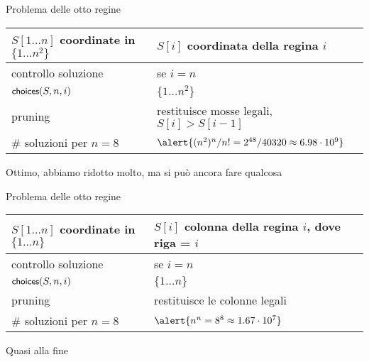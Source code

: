 \begin{frame}{Problema delle otto regine}


\medskip
\begin{tabular}{|P{4cm}|P{7.1cm}|}
\hline
$S[1 \ldots n]$ coordinate in $\{ 1 \ldots n^2 \}$	&	$S[i]$ coordinata della regina $i$ \\\hline
controllo soluzione	& se $i = n$ \\\hline
$\textsf{{\small choices}}(S, n, i)$	&	$\{ 1 \ldots n^2 \}$ \\\hline
pruning	&	restituisce mosse legali, \alert{\small $S[i] > S[i-1]$} \\\hline
\# soluzioni per $n=8$ 	&		$\alert{(n^2)^n/n! = 2^{48}/40320 \approx 6.98 \cdot 10^{9}}$\\\hline 
\end{tabular}

\smallskip
{}
\BI
\item Ottimo, abbiamo ridotto molto, ma si può ancora fare qualcosa
\EI

\end{frame}


\begin{frame}{Problema delle otto regine}


\medskip
\begin{tabular}{|P{4cm}|P{7.1cm}|}
\hline
$S[1 \ldots n]$ coordinate in $\{ 1 \ldots n \}$	&	$S[i]$ colonna della regina $i$, dove riga = $i$ \\\hline
controllo soluzione	& se $i = n$ \\\hline
$\textsf{{\small choices}}(S, n, i)$	&	$\{ 1 \ldots n \}$ \\\hline
pruning	&	restituisce le colonne legali \\\hline
\# soluzioni per $n=8$ 	&		$\alert{n^n = 8^{8} \approx 1.67 \cdot 10^{7}}$\\\hline 
\end{tabular}

\smallskip
{}
\BI
\item Quasi alla fine
\EI

\end{frame}

